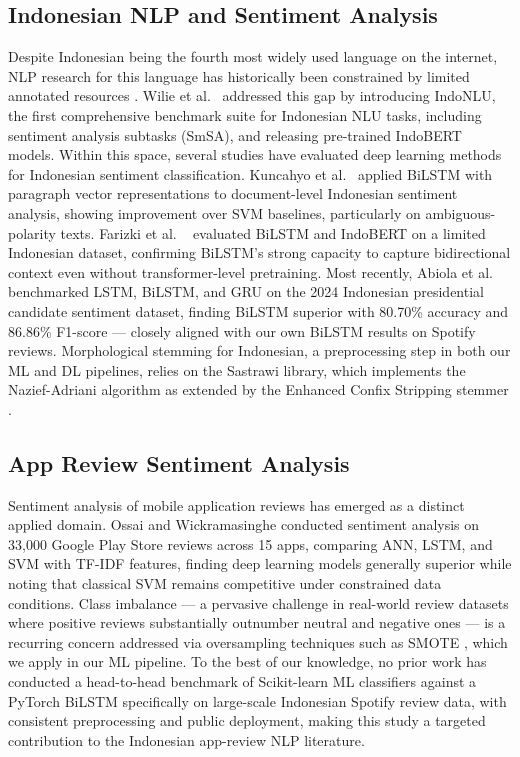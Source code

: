 \documentclass{article}
\begin{document}
\subsection{Indonesian NLP and Sentiment Analysis}
Despite Indonesian being the fourth most widely used language on the internet, NLP research for this language has historically been constrained by limited annotated resources \cite{wilie2020indonlu}. Wilie et al.\ \cite{wilie2020indonlu} addressed this gap by introducing IndoNLU, the first comprehensive benchmark suite for Indonesian NLU tasks, including sentiment analysis subtasks (SmSA), and releasing pre-trained IndoBERT models. Within this space, several studies have evaluated deep learning methods for Indonesian sentiment classification. Kuncahyo et al.\ \cite{kuncahyo2020bilstm} applied BiLSTM with paragraph vector representations to document-level Indonesian sentiment analysis, showing improvement over SVM baselines, particularly on ambiguous-polarity texts. Farizki et al. \ \cite{farizki2025bilstm} evaluated BiLSTM and IndoBERT on a limited Indonesian dataset, confirming BiLSTM's strong capacity to capture bidirectional context even without transformer-level pretraining. Most recently, Abiola et al. \ \cite{abiola2024sentiment} benchmarked LSTM, BiLSTM, and GRU on the 2024 Indonesian presidential candidate sentiment dataset, finding BiLSTM superior with 80.70\% accuracy and 86.86\% F1-score --- closely aligned with our own BiLSTM results on Spotify reviews. Morphological stemming for Indonesian, a preprocessing step in both our ML and DL pipelines, relies on the Sastrawi library, which implements the Nazief-Adriani algorithm as extended by the Enhanced Confix Stripping stemmer \cite{adriani2007stemming}.

\subsection{App Review Sentiment Analysis}
Sentiment analysis of mobile application reviews has emerged as a distinct applied domain. Ossai and Wickramasinghe \cite{ossai2024sentiment} conducted sentiment analysis on 33,000 Google Play Store reviews across 15 apps, comparing ANN, LSTM, and SVM with TF-IDF features, finding deep learning models generally superior while noting that classical SVM remains competitive under constrained data conditions. Class imbalance --- a pervasive challenge in real-world review datasets where positive reviews substantially outnumber neutral and negative ones --- is a recurring concern addressed via oversampling techniques such as SMOTE \cite{chawla2002smote}, which we apply in our ML pipeline. To the best of our knowledge, no prior work has conducted a head-to-head benchmark of Scikit-learn ML classifiers against a PyTorch BiLSTM specifically on large-scale Indonesian Spotify review data, with consistent preprocessing and public deployment, making this study a targeted contribution to the Indonesian app-review NLP literature.
\end{document}
